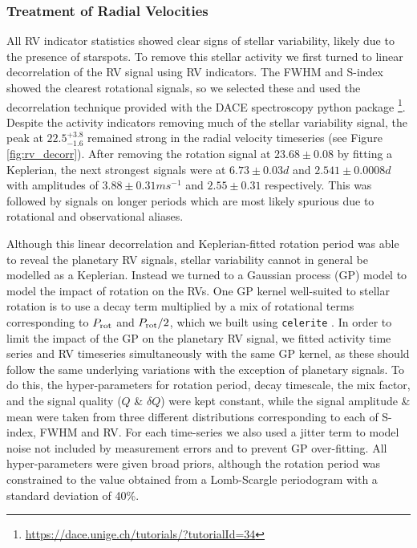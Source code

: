 \documentclass[fleqn,usenatbib]{mnras}
\newcommand{\Tperiod}{ $ 22.5^{+3.8}_{-1.6} $ }
\begin{document}
\subsubsection{Treatment of Radial Velocities}
All RV indicator statistics showed clear signs of stellar variability, likely due to the presence of starspots.
To remove this stellar activity we first turned to linear decorrelation of the RV signal using RV indicators.
The FWHM and S-index showed the clearest rotational signals, so we selected these and used the decorrelation technique provided with the DACE spectroscopy python package \citep{2015ASPC..495....7B}\footnote{\url{https://dace.unige.ch/tutorials/?tutorialId=34}}.
Despite the activity indicators removing much of the stellar variability signal, the peak at \Tperiod{} remained strong in the radial velocity timeseries (see Figure \ref{fig:rv_decorr}).
After removing the rotation signal at $23.68\pm0.08$ by fitting a Keplerian, the next strongest signals were at $6.73\pm0.03d$ and $2.541\pm0.0008d$ with amplitudes of $3.88\pm0.31 ms^{-1}$ and $2.55\pm0.31$ respectively. This was followed by signals on longer periods which are most likely spurious due to rotational and observational aliases.

Although this linear decorrelation and Keplerian-fitted rotation period was able to reveal the planetary RV signals, stellar variability cannot in general be modelled as a Keplerian.
Instead we turned to a Gaussian process (GP) model to model the impact of rotation on the RVs.
One GP kernel well-suited to stellar rotation is to use a decay term multiplied by a mix of rotational terms corresponding to $P_{\rm rot}$ and $P_{\rm rot}/2$, which we built using \texttt{celerite} \citep{foreman2017fast}.
In order to limit the impact of the GP on the planetary RV signal, we fitted activity time series and RV timeseries simultaneously with the same GP kernel, as these should follow the same underlying variations with the exception of planetary signals.
To do this, the hyper-parameters for rotation period, decay timescale, the mix factor, and the signal quality ($Q$ \& $\delta Q$) were kept constant, while the signal amplitude \& mean were taken from three different distributions corresponding to each of S-index, FWHM and RV. 
For each time-series we also used a jitter term to model noise not included by measurement errors and to prevent GP over-fitting.
All hyper-parameters were given broad priors, although the rotation period was constrained to the value obtained from a Lomb-Scargle periodogram with a standard deviation of 40\%.
\end{document}
